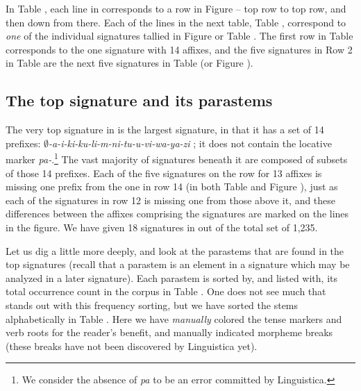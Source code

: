 \documentclass[output=paper,colorlinks,citecolor=brown,
]{langscibook}
\begin{document}
In Table ,  each line in corresponds to a row in Figure  -- top row to top row, and then down from there. Each of the lines in the next table, Table , correspond to \textit{one} of the individual signatures tallied in  Figure  or Table . The first row in Table  corresponds to the one signature with 14 affixes, and the five signatures in Row 2 in Table  are the next five signatures in Table  (or Figure ). 




\subsection{The top signature and its parastems}
The very top signature in  is the largest signature, in that it has a  set of 14 prefixes: \textit{$\emptyset$-a-i-ki-ku-li-m-ni-tu-u-vi-wa-ya-zi} ; it does not contain the locative marker \textit{pa-}.\footnote{We consider the absence of \textit{pa} to be an error committed by Linguistica.} The vast majority of signatures beneath it are composed of subsets of those 14 prefixes. Each of the five signatures on the row for 13 affixes is missing one prefix from the one in row 14 (in both Table  and Figure ), just as each of the signatures in row 12 is missing one from those above it, and these differences between the affixes comprising the signatures are marked on the lines in the figure. We have given 18 signatures in  out of the total set of 1,235. 
 
Let us dig a little more deeply, and look at the parastems that are found in the top signatures (recall that a parastem is an element in a signature which may be analyzed in a later signature). Each parastem is sorted by, and listed with, its total occurrence count in the corpus in Table . One does not see much that stands out with this frequency sorting, but we have sorted the stems alphabetically in Table . Here we have \textit{manually} colored the tense markers and verb roots for the reader's benefit, and manually indicated morpheme breaks (these breaks have not been discovered by Linguistica yet). 
  
  
\end{document}
